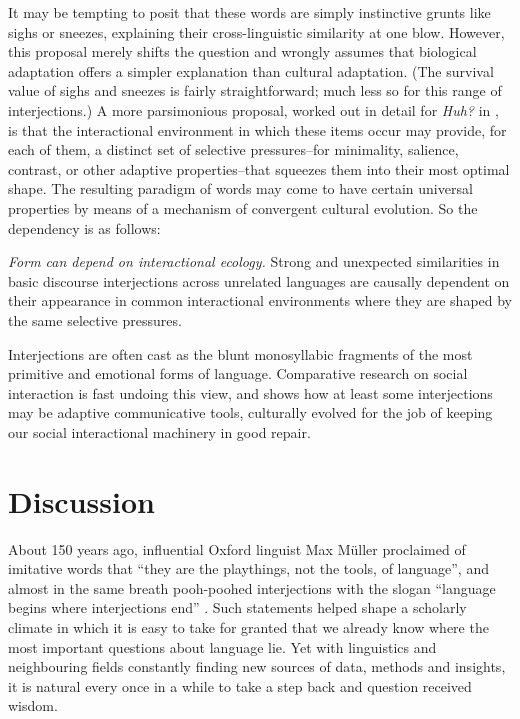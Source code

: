 \documentclass[output=paper]{langsci/langscibook}
\begin{document}
  It may be tempting to posit that these words are simply instinctive grunts like sighs or sneezes, explaining their cross-linguistic similarity at one blow. However, this proposal merely shifts the question and wrongly assumes that biological adaptation offers a simpler explanation than cultural adaptation. (The survival value of sighs and sneezes is fairly straightforward; much less so for this range of interjections.) A more parsimonious proposal, worked out in detail for \textit{Huh?} in \citet{Dingemanse2013}, is that the interactional environment in which these items occur may provide, for each of them, a distinct set of selective pressures--for minimality, salience, contrast, or other adaptive properties--that squeezes them into their most optimal shape. The resulting paradigm of words may come to have certain universal properties by means of a mechanism of convergent cultural evolution. So the dependency is as follows:


\ea
\textit{Form can depend on interactional ecology.} 
 
\textup{Strong and unexpected similarities in basic discourse interjections across unrelated languages are causally dependent on their appearance in common interactional environments where they are shaped by the same selective pressures.}
\z

 Interjections are often cast as the blunt monosyllabic fragments of the most primitive and emotional forms of language. Comparative research on social interaction is fast undoing this view, and shows how at least some interjections may be adaptive communicative tools, culturally evolved for the job of keeping our social interactional machinery in good repair. 


\section{Discussion}

About 150 years ago, influential Oxford linguist Max Müller proclaimed of imitative words that “they are the playthings, not the tools, of language”, and almost in the same breath pooh-poohed interjections with the slogan “language begins where interjections end” \citep[346, 352]{Müller1861}. Such statements helped shape a scholarly climate in which it is easy to take for granted that we already know where the most important questions about language lie. Yet with linguistics and neighbouring fields constantly finding new sources of data, methods and insights, it is natural every once in a while to take a step back and question received wisdom. 
\end{document}
